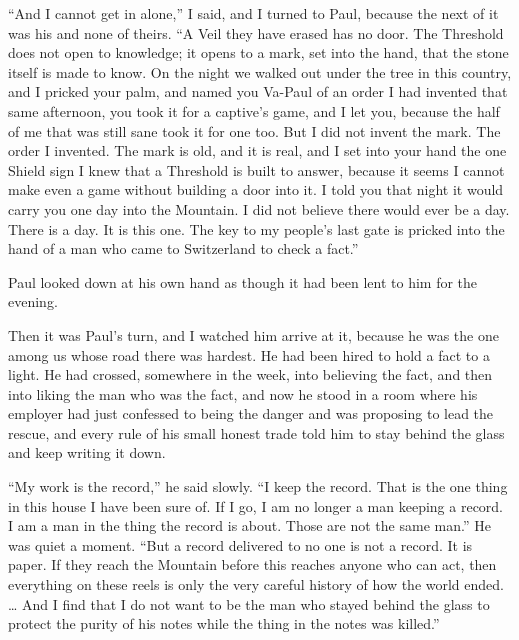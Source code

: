 ``And I cannot get in alone,'' I said, and I turned to Paul, because the next of it was his and none of theirs. ``A Veil they have erased has no door. The Threshold does not open to knowledge; it opens to a mark, set into the hand, that the stone itself is made to know. On the night we walked out under the tree in this country, and I pricked your palm, and named you Va-Paul of an order I had invented that same afternoon, you took it for a captive's game, and I let you, because the half of me that was still sane took it for one too. But I did not invent the mark. The order I invented. The mark is old, and it is real, and I set into your hand the one Shield sign I knew that a Threshold is built to answer, because it seems I cannot make even a game without building a door into it. I told you that night it would carry you one day into the Mountain. I did not believe there would ever be a day. There is a day. It is this one. The key to my people's last gate is pricked into the hand of a man who came to Switzerland to check a fact.''\par

Paul looked down at his own hand as though it had been lent to him for the evening.\par

Then it was Paul's turn, and I watched him arrive at it, because he was the one among us whose road there was hardest. He had been hired to hold a fact to a light. He had crossed, somewhere in the week, into believing the fact, and then into liking the man who was the fact, and now he stood in a room where his employer had just confessed to being the danger and was proposing to lead the rescue, and every rule of his small honest trade told him to stay behind the glass and keep writing it down.\par

``My work is the record,'' he said slowly. ``I keep the record. That is the one thing in this house I have been sure of. If I go, I am no longer a man keeping a record. I am a man in the thing the record is about. Those are not the same man.'' He was quiet a moment. ``But a record delivered to no one is not a record. It is paper. If they reach the Mountain before this reaches anyone who can act, then everything on these reels is only the very careful history of how the world ended. \ldots{} And I find that I do not want to be the man who stayed behind the glass to protect the purity of his notes while the thing in the notes was killed.''\par


